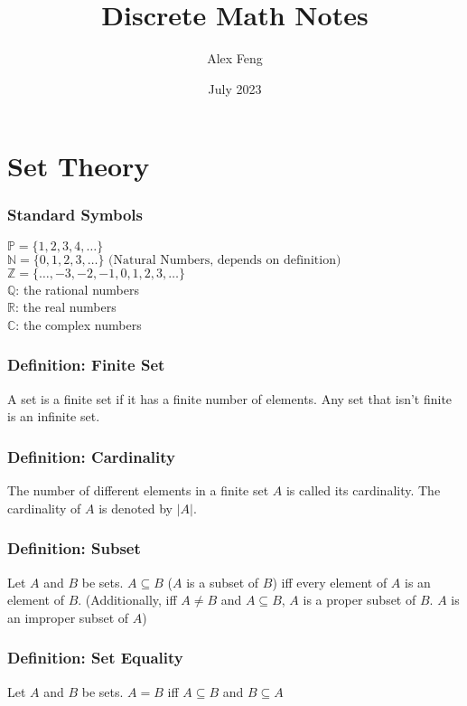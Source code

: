 \documentclass{article}
\title{Discrete Math Notes}
\author{Alex Feng}
\date{July 2023}
\begin{document}
\maketitle

\section{Set Theory}
\subsubsection*{Standard Symbols}
$\mathbb{P} = \{1,2,3,4,\dots \}$ \\
$\mathbb{N} = \{0,1,2,3,\dots \} \text{ (Natural Numbers, depends on definition)}$ \\
$\mathbb{Z} = \{ \dots, -3, -2, -1, 0, 1, 2, 3, \dots \}$ \\
$\mathbb{Q}$: the rational numbers \\
$\mathbb{R}$: the real numbers \\
$\mathbb{C}$: the complex numbers 

\subsubsection*{Definition: Finite Set}
A set is a finite set if it has a finite number of elements. Any set that isn't finite is an infinite set. 

\subsubsection*{Definition: Cardinality}
The number of different elements in a finite set $A$ is called its cardinality. The cardinality of $A$ is denoted by $|A|$. 

\subsubsection*{Definition: Subset}
Let $A$ and $B$ be sets. $A \subseteq B$ ($A$ is a subset of $B$) iff every element of $A$ is an element of $B$. (Additionally, iff $A \neq B$ and $A \subseteq B$, $A$ is a proper subset of $B$. $A$ is an improper subset of $A$) 

\subsubsection*{Definition: Set Equality}
Let $A$ and $B$ be sets. $A = B$ iff $A \subseteq B$ and $B \subseteq A$
\end{document}
